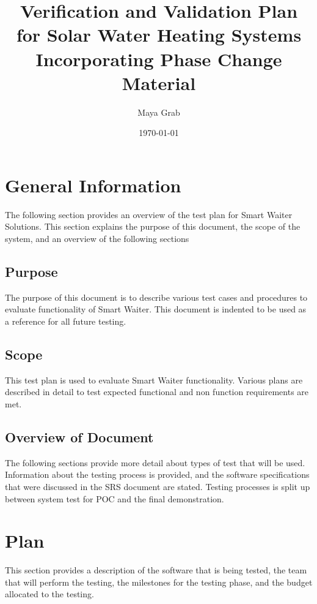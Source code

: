 \documentclass[12pt]{article}
\begin{document}
\title{Verification and Validation Plan for Solar Water Heating Systems Incorporating 
Phase Change Material} 
\author{Maya Grab}
\date{\today}
	
\maketitle

\tableofcontents

%
%

\section{General Information}
The following section provides an overview of the test plan 
for Smart Waiter Solutions.
 This section explains the purpose of this document, the scope of the system, and an overview of the following sections

\subsection{Purpose}
The purpose of this document is to describe  various test cases and procedures to evaluate functionality of Smart Waiter.
This document is indented to be used as a reference for all future testing. 

\subsection{Scope}
This test plan is used to evaluate Smart Waiter functionality. Various plans are described in detail to test expected functional and non function requirements are met.  

\subsection{Overview of Document }
The following sections provide more detail about types of test that will be used. Information about the testing process is provided, and the software specifications
that were discussed in the SRS document are stated. Testing processes is split up between system test for POC and the final demonstration. 

%
%

\section{Plan}
This section provides a description of the software that is being tested, the team that will
perform the testing, the milestones for the testing phase, and the budget allocated to the testing. 
\end{document}
